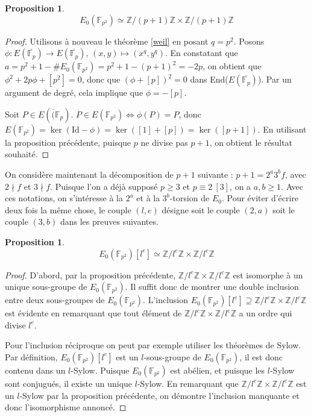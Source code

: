 \documentclass{article}
\theoremstyle{plain}%
\newtheorem{prop}[thm]{Proposition}
\theoremstyle{definition}%
\newcommand{\F}{\mathbb{F}}
\newcommand{\Z}{\mathbb{Z}}
\begin{document}
\begin{prop}
  $$E_0(\F_{p^2}) \simeq \Z/(p+1)\Z \times \Z/(p+1)\Z$$
\end{prop}
\begin{proof}
  Utilisons à nouveau le théorème \ref{weil} en posant $q = p^2$. 
  Posons $\phi : E(\overline{\F_p}) \to E(\overline{\F_p})$, $\left( x, y \right) \mapsto \left( x^{q}, y^{q} \right)$.
  En constatant que $a=p^2 + 1 - \#E_0(\F_{p^2}) = p^2 + 1 - \left( p + 1 \right) ^2 = -2p$, on obtient que $\phi^2 + 2p\phi + [p^2] = 0$, donc que $\left( \phi + [p] \right) ^2 = 0$ dans End($E(\overline{\F_p})$). 
  Par un argument de degré, cela implique que $\phi = -[p]$. 

  Soit $P\in E(\overline(\F_{p})$. $P \in E(\F_{p^2}) \iff \phi(P) = P$, donc $E(\F_{p^2}) = \ker(\text{Id} - \phi) = \ker([1] + [p]) = \ker([p+1])$.
  En utilisant la proposition précédente, puisque $p$ ne divise pas $p+1$, on obtient le résultat souhaité.
\end{proof}

On considère maintenant la décomposition de $p + 1$ suivante : $p + 1 = 2^a 3^b f$, avec $2 \nmid f$ et $3 \nmid f$. Puisque l'on a déjà supposé $p\ge 3$ et $p \equiv 2\ [3]$, on a $a, b\ge 1$. Avec ces notations, on s'intéresse à la $2^a$ et à la $3^b$-torsion de $E_0$. Pour éviter d'écrire deux fois la même chose, le couple $\left( l, e \right)$ désigne soit le couple $(2, a)$ soit le couple $(3, b)$ dans les preuves suivantes. 

\begin{prop}
  $$E_0(\F_{p^2})[l^e] \simeq \Z/l^e\Z \times \Z/l^e\Z$$
\end{prop}

\begin{proof}
  D'abord, par la proposition précédente, $\Z/l^e\Z \times \Z/l^e\Z$ est isomorphe à un unique sous-groupe de $E_0(\F_{p^2})$.
  Il suffit donc de montrer une double inclusion entre deux sous-groupes de $E_0(\F_{p^2})$.
  L'inclusion \allowbreak$E_0(\F_{p^2})[l^e] \supseteq \Z/l^e\Z \times \Z/l^e\Z$ est évidente en remarquant que tout élément de $\Z/l^e\Z \times \Z/l^e\Z$ a un ordre qui divise $l^e$.
  
  Pour l'inclusion réciproque on peut par exemple utiliser les théorèmes de Sylow. 
  Par définition, $E_0(\F_{p^2})[l^e]$ est un $l$-sous-groupe de $E_0(\F_{p^2})$, il est donc contenu dans un $l$-Sylow. 
  Puisque $E_0(\F_{p^2})$ est abélien, et puisque les $l$-Sylow sont conjugués, il existe un unique $l$-Sylow. 
  En remarquant que $\Z/l^e\Z \times \Z/l^e\Z$ est un $l$-Sylow par la proposition précédente, on démontre l'inclusion manquante et donc l'isomorphisme annoncé. 
\end{proof}
\end{document}
